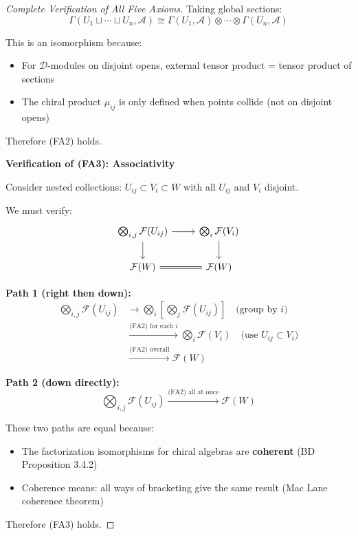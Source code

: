 \begin{example}
\begin{proof}[Complete Verification of All Five Axioms]
Taking global sections:
$$\Gamma(U_1 \sqcup \cdots \sqcup U_n, \mathcal{A}) \cong 
   \Gamma(U_1, \mathcal{A}) \otimes \cdots \otimes \Gamma(U_n, \mathcal{A})$$

This is an isomorphism because:
\begin{itemize}
\item For $\mathcal{D}$-modules on disjoint opens, external tensor product = tensor 
   product of sections
\item The chiral product $\mu_{ij}$ is only defined when points collide (not on disjoint 
   opens)
\end{itemize}

Therefore (FA2) holds.

\textbf{Verification of (FA3): Associativity}

Consider nested collections: $U_{ij} \subset V_i \subset W$ with all $U_{ij}$ and 
$V_i$ disjoint.

We must verify:
$$\begin{tikzcd}
\bigotimes_{i,j} \mathcal{F}(U_{ij}) 
   \arrow[r] \arrow[d] &
\bigotimes_i \mathcal{F}(V_i) \arrow[d] \\
\mathcal{F}(W) \arrow[r, equal] & \mathcal{F}(W)
\end{tikzcd}$$

\textbf{Path 1 (right then down):}
\begin{align*}
\bigotimes_{i,j} \mathcal{F}(U_{ij}) 
&\to \bigotimes_i \left[\bigotimes_j \mathcal{F}(U_{ij})\right] 
   \quad \text{(group by } i\text{)} \\
&\xrightarrow{\text{(FA2) for each } i} \bigotimes_i \mathcal{F}(V_i) 
   \quad \text{(use } U_{ij} \subset V_i\text{)} \\
&\xrightarrow{\text{(FA2) overall}} \mathcal{F}(W)
\end{align*}

\textbf{Path 2 (down directly):}
$$\bigotimes_{i,j} \mathcal{F}(U_{ij}) \xrightarrow{\text{(FA2) all at once}} 
   \mathcal{F}(W)$$

These two paths are equal because:
\begin{itemize}
\item The factorization isomorphisms for chiral algebras are \textbf{coherent} 
   (BD Proposition 3.4.2)
\item Coherence means: all ways of bracketing give the same result (Mac Lane coherence 
   theorem)
\end{itemize}

Therefore (FA3) holds.


\end{proof}
\end{example}

